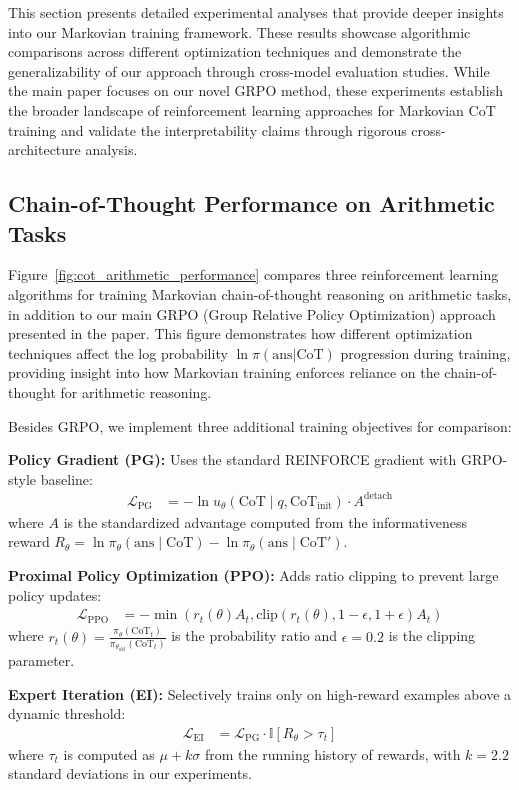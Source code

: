 \documentclass{article}
\begin{document}
This section presents detailed experimental analyses that provide deeper insights into our Markovian training framework. These results showcase algorithmic comparisons across different optimization techniques and demonstrate the generalizability of our approach through cross-model evaluation studies. While the main paper focuses on our novel GRPO method, these experiments establish the broader landscape of reinforcement learning approaches for Markovian CoT training and validate the interpretability claims through rigorous cross-architecture analysis.

\subsection{Chain-of-Thought Performance on Arithmetic Tasks}
Figure~\ref{fig:cot_arithmetic_performance} compares three reinforcement learning algorithms for training Markovian chain-of-thought reasoning on arithmetic tasks, in addition to our main GRPO (Group Relative Policy Optimization) approach presented in the paper. This figure demonstrates how different optimization techniques affect the log probability $\ln \pi(\text{ans} | \text{CoT})$ progression during training, providing insight into how Markovian training enforces reliance on the chain-of-thought for arithmetic reasoning.

Besides GRPO, we implement three additional training objectives for comparison:

\textbf{Policy Gradient (PG):} Uses the standard REINFORCE gradient with GRPO-style baseline:
\begin{align}
\mathcal{L}_{\text{PG}} &= -\ln u_\theta(\text{CoT} \mid q, \text{CoT}_{\text{init}}) \cdot A^{\text{detach}}
\end{align}
where $A$ is the standardized advantage computed from the informativeness reward $R_\theta = \ln \pi_\theta(\text{ans} \mid \text{CoT}) - \ln \pi_\theta(\text{ans} \mid \text{CoT}')$.

\textbf{Proximal Policy Optimization (PPO):} Adds ratio clipping to prevent large policy updates:
\begin{align}
\mathcal{L}_{\text{PPO}} &= -\min(r_t(\theta) A_t, \text{clip}(r_t(\theta), 1-\epsilon, 1+\epsilon) A_t)
\end{align}
where $r_t(\theta) = \frac{\pi_\theta(\text{CoT}_t)}{\pi_{\theta_{\text{old}}}(\text{CoT}_t)}$ is the probability ratio and $\epsilon = 0.2$ is the clipping parameter.

\textbf{Expert Iteration (EI):} Selectively trains only on high-reward examples above a dynamic threshold:
\begin{align}
\mathcal{L}_{\text{EI}} &= \mathcal{L}_{\text{PG}} \cdot \mathbb{I}[R_\theta > \tau_t]
\end{align}
where $\tau_t$ is computed as $\mu + k\sigma$ from the running history of rewards, with $k = 2.2$ standard deviations in our experiments.
\end{document}
